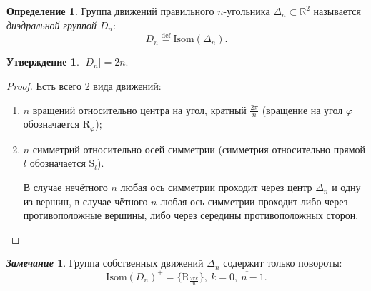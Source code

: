 \documentclass[a4paper, 14pt]{extarticle}
\newcommand{\deq}{\stackrel{\mathrm{def}}{=}}
\newcommand{\n}{\par}
\newcommand{\real}{\mathbb{R}}
\newcommand{\Isom}{\mathrm{Isom}}
\newcommand{\Rot}{\mathrm{R}}
\newcommand{\Sym}{\mathrm{S}}
\renewcommand{\phi}{\varphi}
\theoremstyle{definition}
\newtheorem*{remark}{\textit{Замечание}}
\newtheorem{definition}{Определение}
\theoremstyle{plain}
\numberwithin{theorem}{section}
\numberwithin{definition}{section}
\newtheorem{statement}{Утверждение}
\numberwithin{statement}{section}
\numberwithin{lemma}{section}
\numberwithin{consequence}{section}
\begin{document}
	\newpage
	\begin{definition}
		Группа движений правильного $n$-угольника ${\Delta_n \subset \real^2}$ называется \textit{диэдральной группой} $D_n{:}$
		\begin{equation*}
			D_n \deq \Isom(\Delta_n).
		\end{equation*}
	\end{definition}
	\begin{statement}
		${|D_n| = 2n.}$
	\end{statement}
        \begin{proof}
            Есть всего 2 вида движений:
		\begin{enumerate}
			\setlength\itemsep{0.1em}
			\item $n$ вращений относительно центра на угол, кратный $\frac{2\pi}{n}$ (вращение на угол $\phi$ обозначается $\Rot_\phi$);
			\item $n$ симметрий относительно осей симметрии (симметрия относительно прямой $l$ обозначается $\Sym_l$). \n В случае нечётного $n$ любая ось симметрии проходит через центр $\Delta_n$ и одну из вершин, в случае чётного $n$ любая ось симметрии проходит либо через противоположные вершины, либо через середины противоположных сторон. \qedhere
		\end{enumerate}
        \end{proof}
	\begin{remark}
		Группа собственных движений $\Delta_n$ содержит только повороты:
		\begin{equation*}
			\Isom(D_n)^+ = \{\Rot_{\frac{2\pi k}{n}}\}, \ k = \overline{0, \ n - 1}.
		\end{equation*}
	\end{remark}
\end{document}
